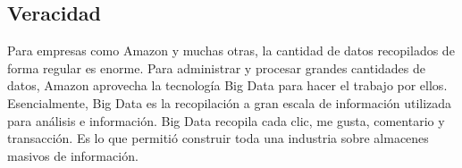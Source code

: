 \clearpage
\subsection{Veracidad}
Para empresas como Amazon y muchas otras, la cantidad de datos recopilados de forma regular es enorme. Para administrar y procesar grandes cantidades de datos, Amazon aprovecha la tecnología Big Data para hacer el trabajo por ellos. Esencialmente, Big Data es la recopilación a gran escala de información utilizada para análisis e información. Big Data recopila cada clic, me gusta, comentario y transacción. Es lo que permitió construir toda una industria sobre almacenes masivos de información.
